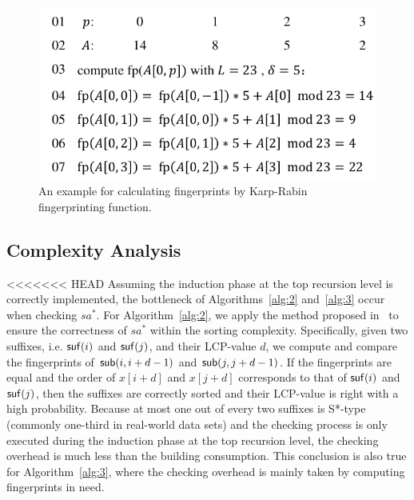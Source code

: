 \documentclass[10pt,journal,compsoc]{IEEEtran}
\begin{document}
\begin{figure}[htbp!]
	\centering
	
	\includegraphics[width = 1\columnwidth]{example2.pdf}
	
	\caption{An example for calculating fingerprints by Karp-Rabin fingerprinting function.}
	
	\label{fig:example2}
	
\end{figure}

\subsection{Complexity Analysis}

<<<<<<< HEAD
Assuming the induction phase at the top recursion level is correctly implemented, the bottleneck of Algorithms~\ref{alg:2} and~\ref{alg:3} occur when checking $sa^*$. For Algorithm~\ref{alg:2}, we apply the method proposed in~\cite{wu2017} to ensure the correctness of $sa^*$ within the sorting complexity. Specifically, given two suffixes, i.e. ${\sf suf}(i)$ and ${\sf suf}(j)$, and their LCP-value $d$, we compute and compare the fingerprints of ${\sf sub}(i, i + d - 1)$ and ${\sf sub}(j, j + d - 1)$. If the fingerprints are equal and the order of $x[i + d]$ and $x[j + d]$ corresponds to that of ${\sf suf}(i)$ and ${\sf suf}(j)$, then the suffixes are correctly sorted and their LCP-value is right with a high probability. Because at most one out of every two suffixes is S*-type (commonly one-third in real-world data sets) and the checking process is only executed during the induction phase at the top recursion level, the checking overhead is much less than the building consumption. This conclusion is also true for Algorithm~\ref{alg:3}, where the checking overhead is mainly taken by computing fingerprints in need.
 
\end{document}
